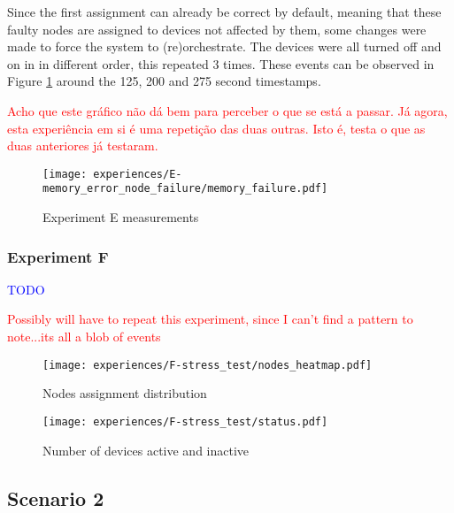 Since the first assignment can already be correct by default, meaning that these faulty nodes are assigned to devices not affected by them, some changes were made to force the system to (re)orchestrate. The devices were all turned off and on in in different order, this repeated 3 times. These events can be observed in Figure \ref{fig:experiment_e_graph} around the 125, 200 and 275 second timestamps.

\textcolor{red}{Acho que este gráfico não dá bem para perceber o que se está a passar. Já agora, esta experiência em si é uma repetição das duas outras. Isto é, testa o que as duas anteriores já testaram.}

\begin{figure}[h]
\centering
\texttt{[image: experiences/E-memory\_error\_node\_failure/memory\_failure.pdf]}
\caption[Experiment E measurements]{Experiment E measurements}\label{fig:experiment_e_graph}
\end{figure}


\subsubsection{Experiment F}

\textcolor{blue}{TODO}

\textcolor{red}{Possibly will have to repeat this experiment, since I can't find a pattern to note...its all a blob of events}

\begin{figure*}[h]
    \centering
    \texttt{[image: experiences/F-stress\_test/nodes\_heatmap.pdf]}
    \caption[Nodes assignment distribution]{Nodes assignment distribution}\label{fig:stress_test_nodes}
\end{figure*}

\begin{figure}[h]
\centering
\texttt{[image: experiences/F-stress\_test/status.pdf]}
\caption[Number of devices active and inactive]{Number of devices active and inactive}\label{fig:stress_test_status}
\end{figure}


\subsection{Scenario 2}\label{sec:discussion_scenario2}

